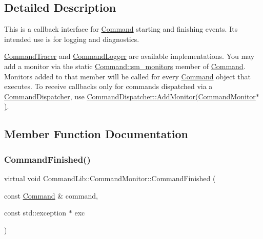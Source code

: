 \subsection{Detailed Description}
This is a callback interface for \mbox{\hyperlink{class_command_lib_1_1_command}{Command}} starting and finishing events. Its intended use is for logging and diagnostics. 

\mbox{\hyperlink{class_command_lib_1_1_command_tracer}{Command\+Tracer}} and \mbox{\hyperlink{class_command_lib_1_1_command_logger}{Command\+Logger}} are available implementations. You may add a monitor via the static \mbox{\hyperlink{class_command_lib_1_1_command_aa4ceb8d85a720bc5d9bac4be3afd7df5}{Command\+::sm\+\_\+monitors}} member of \mbox{\hyperlink{class_command_lib_1_1_command}{Command}}. Monitors added to that member will be called for every \mbox{\hyperlink{class_command_lib_1_1_command}{Command}} object that executes. To receive callbacks only for commands dispatched via a \mbox{\hyperlink{class_command_lib_1_1_command_dispatcher}{Command\+Dispatcher}}, use \mbox{\hyperlink{class_command_lib_1_1_command_dispatcher_a2995e97c734165b7d0b3491d606c547b}{Command\+Dispatcher\+::\+Add\+Monitor(\+Command\+Monitor$\ast$)}}. 

\subsection{Member Function Documentation}
\mbox{\label{class_command_lib_1_1_command_monitor_a9e140c071319976689d26b5996356cb4}} 
\subsubsection{\texorpdfstring{Command\+Finished()}{CommandFinished()}}
{\footnotesize\ttfamily virtual void Command\+Lib\+::\+Command\+Monitor\+::\+Command\+Finished (\begin{DoxyParamCaption}\item[{const \mbox{\hyperlink{class_command_lib_1_1_command}{Command}} \&}]{command,  }\item[{const std\+::exception $\ast$}]{exc }\end{DoxyParamCaption})\hspace{0.3cm}{\ttfamily [pure virtual]}}



